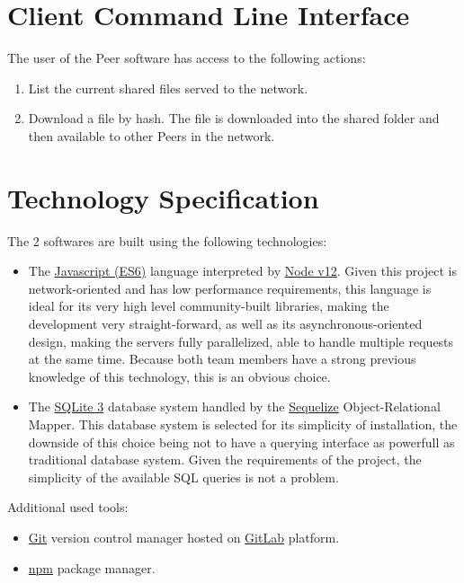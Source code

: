 \documentclass{article}
\begin{document}
\section{Client Command Line Interface}

The user of the Peer software has access to the following actions:

\begin{enumerate}
	\item List the current shared files served to the network.
	\item Download a file by hash. The file is downloaded into the shared folder and then available to other Peers in the network.
\end{enumerate}

\section{Technology Specification}

The 2 softwares are built using the following technologies:

\begin{itemize}
	\item The \href{https://developer.mozilla.org/en-US/docs/Web/JavaScript}{Javascript (ES6)} language interpreted by \href{https://nodejs.org/en/}{Node v12}. Given this project is network-oriented and has low performance requirements, this language is ideal for its very high level community-built libraries, making the development very straight-forward, as well as its asynchronous-oriented design, making the servers fully parallelized, able to handle multiple requests at the same time. Because both team members have a strong previous knowledge of this technology, this is an obvious choice.
	\item The \href{https://sqlite.org/index.html}{SQLite 3} database system handled by the \href{https://sequelize.org}{Sequelize} Object-Relational Mapper. This database system is selected for its simplicity of installation, the downside of this choice being not to have a querying interface as powerfull as traditional database system. Given the requirements of the project, the simplicity of the available SQL queries is not a problem.
\end{itemize}


\noindent Additional used tools:

\begin{itemize}
	\item \href{https://git-scm.com}{Git} version control manager hosted on \href{https://gitlab.com}{GitLab} platform.
	\item \href{https://www.npmjs.com}{npm} package manager.
\end{itemize}
\end{document}
